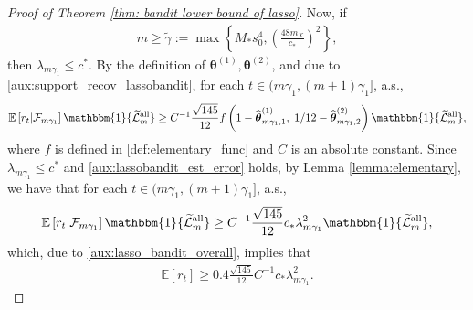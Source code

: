 \documentclass[aos,preprint]{imsart}
\theoremstyle{plain}
\theoremstyle{definition}
\newcommand{\btheta}{\boldsymbol{\theta}}
\newcommand{\hbtheta}{\widehat{\boldsymbol{\theta}}}
\newcommand{\idf}{\mathbbm{1}}
\newcommand{\cF}{\mathcal{F}}
\newcommand{\Exp}{\mathbb{E}}
\newcommand{\tL}{\widetilde{\mathcal{L}}}
\begin{document}
\begin{appendix}
\begin{proof}[Proof of Theorem \ref{thm: bandit lower bound of lasso}]
Now, if
\begin{align}
    \label{def:m another requirement}
    m \geq \tilde{\gamma} := \max\left\{M_* s_0^4,  \left(\frac{48 m_X}{c_*}\right)^2\right\},
\end{align}
then $\lambda_{m\gamma_1} \leq c^*$. By the definition of $\btheta^{(1)},\btheta^{(2)}$, and due to \eqref{aux:support_recov_lassobandit}, for each $t \in (m\gamma_1, (m+1)\gamma_1]$, a.s.,
\begin{align*}
     \Exp\left[r_t \vert \cF_{m\gamma_1}\right]   \idf\{\tL_m^{\textup{all}}\}  
   \geq C^{-1} \frac{\sqrt{145}}{12}   f\left(1-\hbtheta_{m\gamma_1,1}^{(1)},\; 1/12-\hbtheta_{m\gamma_1,2}^{(2)}\right)  \idf\{\tL_m^{\textup{all}}\},
\end{align*}
where $f$ is defined in \eqref{def:elementary_func} and $C$ is an absolute constant. Since $\lambda_{m\gamma_1} \leq c^*$ and  \eqref{aux:lassobandit_est_error} holds, by Lemma \ref{lemma:elementary}, we have that for each $t \in (m\gamma_1, (m+1)\gamma_1]$, a.s.,
\begin{align}\label{aux:lassobandit_instant_regret}
     \Exp\left[r_t \vert \cF_{m\gamma_1}\right]   \idf\{\tL_m^{\textup{all}}\}  
   \geq C^{-1} \frac{\sqrt{145}}{12} c_*\lambda_{m\gamma_1}^2 \idf\{\tL_m^{\textup{all}}\},
\end{align}
which, due to \eqref{aux:lasso_bandit_overall}, implies that
\begin{align*}
  \Exp\left[r_t \right]  \geq 0.4 \frac{\sqrt{145}}{12} C^{-1}  c_* \lambda_{m\gamma_1}^2.
\end{align*}


\end{proof}
\end{appendix}
\end{document}
